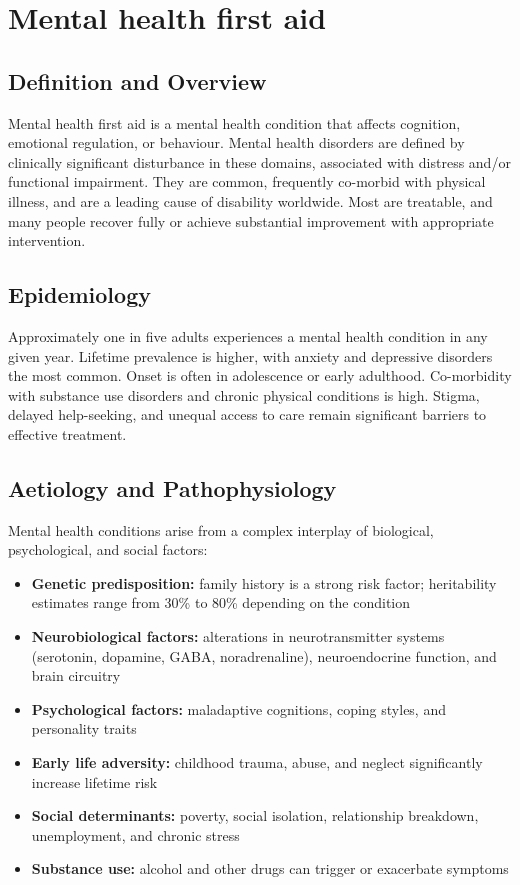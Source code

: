 \chapter{Mental health first aid}

\section*{Definition and Overview}
Mental health first aid is a mental health condition that affects cognition, emotional regulation, or behaviour. Mental health disorders are defined by clinically significant disturbance in these domains, associated with distress and/or functional impairment. They are common, frequently co-morbid with physical illness, and are a leading cause of disability worldwide. Most are treatable, and many people recover fully or achieve substantial improvement with appropriate intervention.

\section*{Epidemiology}
Approximately one in five adults experiences a mental health condition in any given year. Lifetime prevalence is higher, with anxiety and depressive disorders the most common. Onset is often in adolescence or early adulthood. Co-morbidity with substance use disorders and chronic physical conditions is high. Stigma, delayed help-seeking, and unequal access to care remain significant barriers to effective treatment.

\section*{Aetiology and Pathophysiology}
Mental health conditions arise from a complex interplay of biological, psychological, and social factors:

\begin{itemize}
    \item \textbf{Genetic predisposition:} family history is a strong risk factor; heritability estimates range from 30\% to 80\% depending on the condition
    \item \textbf{Neurobiological factors:} alterations in neurotransmitter systems (serotonin, dopamine, GABA, noradrenaline), neuroendocrine function, and brain circuitry
    \item \textbf{Psychological factors:} maladaptive cognitions, coping styles, and personality traits
    \item \textbf{Early life adversity:} childhood trauma, abuse, and neglect significantly increase lifetime risk
    \item \textbf{Social determinants:} poverty, social isolation, relationship breakdown, unemployment, and chronic stress
    \item \textbf{Substance use:} alcohol and other drugs can trigger or exacerbate symptoms
\end{itemize}

